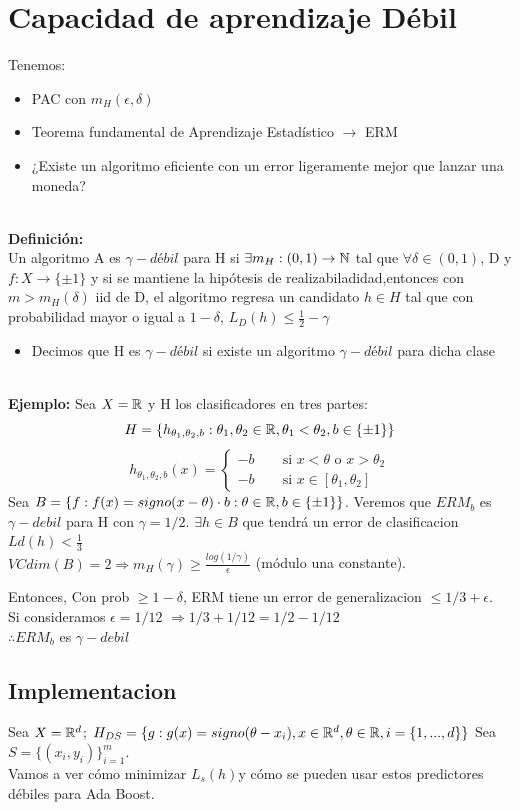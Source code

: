 \documentclass[11pt,reqno,twoside]{article}
\begin{document}
\section{Capacidad de aprendizaje Débil}
Tenemos:
\begin{itemize}
    \item PAC con $m_H(\epsilon, \delta)$
    \item Teorema fundamental de Aprendizaje Estadístico $\rightarrow$ ERM
    \item ¿Existe un algoritmo eficiente con un error ligeramente mejor que lanzar una moneda?
\end{itemize}
\\
\textbf{Definición:}\\
Un algoritmo A es $\gamma-débil$ para H si $\exists m_H:(0,1)\rightarrow \mathbb{N}$ tal que $\forall \delta \in (0,1)$, D y $f: X \rightarrow \{ \pm 1\}$ y si se mantiene la hipótesis de realizabiladidad,entonces con $m> m_H(\delta)$ iid de D, el algoritmo regresa un candidato $h \in H$ tal que con probabilidad mayor o igual a $1-\delta$, $L_D(h)\leq \frac{1}{2}-\gamma$
\begin{itemize}
    \item Decimos que H es $\gamma- débil$ si existe un algoritmo $\gamma-débil$ para dicha clase
\end{itemize}
\\
\textbf{Ejemplo:} Sea $X=\mathbb{R}$ y H los clasificadores en tres partes:
\[H= \{ h_{\theta_1, \theta_2,b}: \theta_1, \theta_2 \in \mathbb{R}, \theta_1 < \theta_2 , b \in \{ \pm 1\}\}\]
\[h_{\theta_1, \theta_2,b}(x)= \begin{cases}-b \qquad \text{si }  x<\theta \text{ o } x>\theta_2\\-b \qquad \text{si } x\in [\theta_1, \theta_2]\end{cases} \]
Sea $B=\{f:f(x)=signo(x-\theta) \cdot b : \theta \in \mathbb{R}, b \in \{\pm 1\}\}$. Veremos que $ERM_b$ es $\gamma-debil$ para H con $\gamma=1/2$. $\exists h \in B$ que tendrá un error de clasificacion $Ld(h)<\frac{1}{3}$\\
$VCdim(B)=2 \Rightarrow m_H(\gamma) \geq \frac{log(1/\gamma)}{\epsilon}$ (módulo una constante).

Entonces, Con prob $ \geq 1-\delta$, ERM tiene un error de generalizacion $\leq 1/3 + \epsilon. $\\ Si consideramos $\epsilon =1/12$ $\Rightarrow 1/3+1/12=1/2-1/12$\\
$\therefore ERM_b$  es $\gamma-debil$

\subsection{Implementacion}
Sea $X= \mathbb{R}^d$; $H_{DS}=\{g:g(x)=signo(\theta-x_i), x \in \mathbb{R} ^d, \theta \in \mathbb{R}, i=\{1,..., d\}\}$
Sea $S=\{(x_i, y_i)\}_{i=1}^{m}$.\\ Vamos a ver cómo minimizar $L_s(h)$y cómo se pueden usar estos predictores débiles para Ada Boost.
\end{document}
